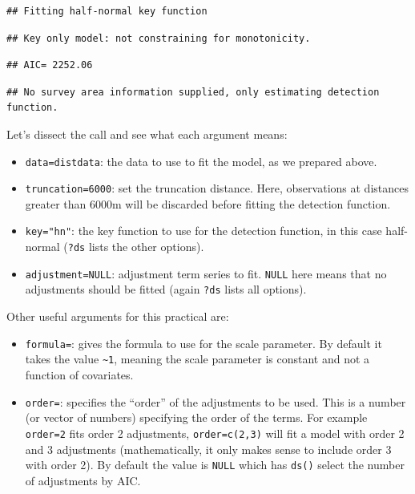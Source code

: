 \documentclass[]{book}
\providecommand{\tightlist}{%
  \setlength{\itemsep}{0pt}\setlength{\parskip}{0pt}}
\theoremstyle{definition}
\theoremstyle{definition}
\theoremstyle{remark}
\begin{document}
\begin{verbatim}
## Fitting half-normal key function
\end{verbatim}

\begin{verbatim}
## Key only model: not constraining for monotonicity.
\end{verbatim}

\begin{verbatim}
## AIC= 2252.06
\end{verbatim}

\begin{verbatim}
## No survey area information supplied, only estimating detection function.
\end{verbatim}

Let's dissect the call and see what each argument means:

\begin{itemize}
\tightlist
\item
  \texttt{data=distdata}: the data to use to fit the model, as we
  prepared above.
\item
  \texttt{truncation=6000}: set the truncation distance. Here,
  observations at distances greater than 6000m will be discarded before
  fitting the detection function.
\item
  \texttt{key="hn"}: the key function to use for the detection function,
  in this case half-normal (\texttt{?ds} lists the other options).
\item
  \texttt{adjustment=NULL}: adjustment term series to fit. \texttt{NULL}
  here means that no adjustments should be fitted (again \texttt{?ds}
  lists all options).
\end{itemize}

Other useful arguments for this practical are:

\begin{itemize}
\tightlist
\item
  \texttt{formula=}: gives the formula to use for the scale parameter.
  By default it takes the value \texttt{\textasciitilde{}1}, meaning the
  scale parameter is constant and not a function of covariates.
\item
  \texttt{order=}: specifies the ``order'' of the adjustments to be
  used. This is a number (or vector of numbers) specifying the order of
  the terms. For example \texttt{order=2} fits order 2 adjustments,
  \texttt{order=c(2,3)} will fit a model with order 2 and 3 adjustments
  (mathematically, it only makes sense to include order 3 with order 2).
  By default the value is \texttt{NULL} which has \texttt{ds()} select
  the number of adjustments by AIC.
\end{itemize}
\end{document}
